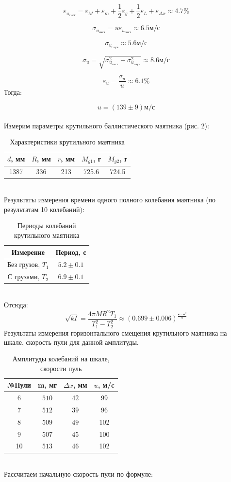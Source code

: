\documentclass[a4paper]{article}
\begin{document}
\[\varepsilon_{u_{\text{снст}}} = \varepsilon_M + \varepsilon_m + \frac{1}{2} \varepsilon_g + \frac{1}{2} \varepsilon_L + \varepsilon_{\Delta x} \approx 4.7\%\]

\[\sigma_{u_{\text{снст}}} = u \varepsilon_{u_{\text{снст}}} \approx 6.5 \text{м/с}\]

\[\sigma_{u_{\text{случ}}} \approx 5.6 \text{м/с}\]

\[\sigma_u = \sqrt{\sigma_{u_{\text{снст}}}^2 + \sigma_{u_{\text{случ}}}^2} \approx 8.6 \text{м/с} \]

\[\varepsilon_u = \frac{\sigma_u}{u} \approx 6.1\%\]
Тогда:

\[u = (139 \pm 9) \text{м/с}\]
\\
Измерим параметры крутильного баллистического маятника (рис. 2):
\begin{table}[!h]
\centering
\caption{Характеристики крутильного маятника}
\begin{tabular}{|c|c|c|c|c|}        \hline
    $d$, мм & $R$, мм & $r$, мм & $M_{g1}$, г& $M_{g2}$, г\\ \hline
    1387 & 336 & 213 & 725.6 & 724.5 \\ \hline
\end{tabular}
\end{table} \\
Результаты измерения времени одного полного колебания маятника (по результатам 10 колебаний):
\begin{table}[!h]
\centering
\caption{ Периоды колебаний крутильного маятника}
\begin{tabular}{|c|c|}        \hline
    Измерение & Период, с \\  \hline
    Без грузов, $T_1$ & $5.2\pm 0.1$  \\ \hline
    С грузами, $T_2$ & $6.9\pm 0.1$ \\ \hline
\end{tabular}
\end{table} \\
Отсюда:
\[\sqrt{kI} = \frac{4\pi MR^2 T_1}{T_1^2 - T_2^2} \approx (0.699 \pm 0.006)^{\frac{\text{кг} \cdot \text{м}^2}{\text{с}}}\]
Результаты измерения горизонтального смещения крутильного маятника на шкале, скорость пули для данной амплитуды.
\begin{table}[!h]
\centering
\caption{Амплитуды колебаний на шкале, скорости пуль}
\begin{tabular}{|c|c|c|c|}        \hline
    №Пули &  m, мг & $\Delta x$, мм & $u$, м/c \\  \hline
    6 & $510$ & $42$ & 99\\ \hline
    7 & $512$ & $39$ & 96\\ \hline
    8 & $509$ & $49$ & 102\\ \hline
    9 & $507$ & $45$ & 100\\ \hline
    10 & $513$ & $46$ & 102\\ \hline
\end{tabular}
\end{table} \\
Рассчитаем начальную скорость пули по формуле:
\end{document}
